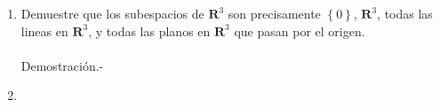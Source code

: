 \begin{enumerate}[\bfseries 1.]
    \item Demuestre que los subespacios de $\textbf{R}^3$ son precisamente $\left\{0\right\}$, $\textbf{R}^3$, todas las lineas en $\textbf{R}^3$, y todas las planos en $\textbf{R}^3$ que pasan por el origen.\\\\ 
	Demostración.-\; 

    \item 

	

\end{enumerate}
